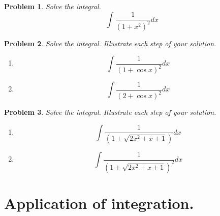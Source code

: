 \documentclass[12pt]{book}
\newtheorem{problem}{Problem}[section]
\begin{document}
\begin{problem}
Solve the integral. 
\[
\int \frac{1}{(1+x^2)^2}dx
\]
\end{problem}

\begin{problem}
Solve the integral. Illustrate each step of your solution.
\begin{enumerate}
\item
\[
\int \frac{1}{(1 + \cos x)^2}dx
\]
\item
\[
\int \frac{1}{(2+\cos x)^2}dx
\]
\end{enumerate}
\end{problem}
\begin{problem}
Solve the integral. Illustrate each step of your solution.
\begin{enumerate}
\item
\[
\int \frac{1}{(1 + \sqrt{2x^2+x+1})}dx
\]
\item
\[
\int \frac{1}{(1 + \sqrt{2x^2+x+1})^2}dx
\]
\end{enumerate}
\end{problem}
\section{Application of integration.}
\end{document}
